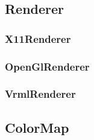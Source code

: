 \subsection{{\bf Renderer}}

\pagebreak

\subsubsection{ X11Renderer}
%
\pagebreak

\subsubsection{ OpenGlRenderer}
%
\pagebreak

\subsubsection{ VrmlRenderer}
%
\pagebreak

\subsection{{\bf ColorMap}}

\pagebreak